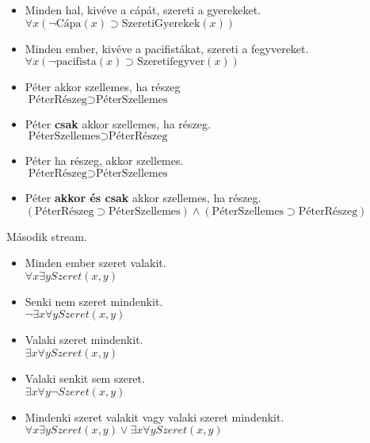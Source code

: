 \documentclass{article}
\begin{document}
\begin{itemize}
\item
 Minden hal, kivéve a cápát, szereti a gyerekeket. \\
$\forall x ( \neg \text{Cápa}(x) \supset \text{SzeretiGyerekek}(x))$

\item
 Minden ember, kivéve a pacifistákat, szereti a fegyvereket. \\
$\forall x ( \neg \text{pacifista}(x) \supset \text{Szeretifegyver}(x))$

\item
Péter akkor szellemes, ha részeg\\
$ \text{PéterRészeg} \supset  \text{PéterSzellemes}$

\item
Péter \textbf{csak} akkor szellemes, ha részeg.\\
$ \text{PéterSzellemes} \supset  \text{PéterRészeg}$

\item
Péter ha részeg, akkor szellemes.\\
$ \text{PéterRészeg} \supset  \text{PéterSzellemes}$


\item
Péter \textbf{akkor és csak} akkor szellemes, ha részeg.\\
$( \text{PéterRészeg} \supset  \text{PéterSzellemes})\wedge( \text{PéterSzellemes} \supset  \text{PéterRészeg})$

 \end{itemize}

Második stream.

\begin{itemize}
\item
 Minden ember szeret valakit. \\
$\forall x \exists y Szeret(x, y)$

\item
Senki nem szeret mindenkit. \\
$\neg \exists x \forall y  Szeret(x, y)$

\item
Valaki szeret mindenkit. \\
$\exists x \forall y  Szeret(x, y)$


\item
Valaki senkit sem szeret. \\
$\exists x  \forall y  \neg  Szeret (x, y)$

\item
Mindenki szeret valakit vagy valaki szeret mindenkit. \\
$ \forall x \exists y Szeret(x, y) \vee \exists x \forall y  Szeret(x, y)$

 \end{itemize}
 
\end{document}
